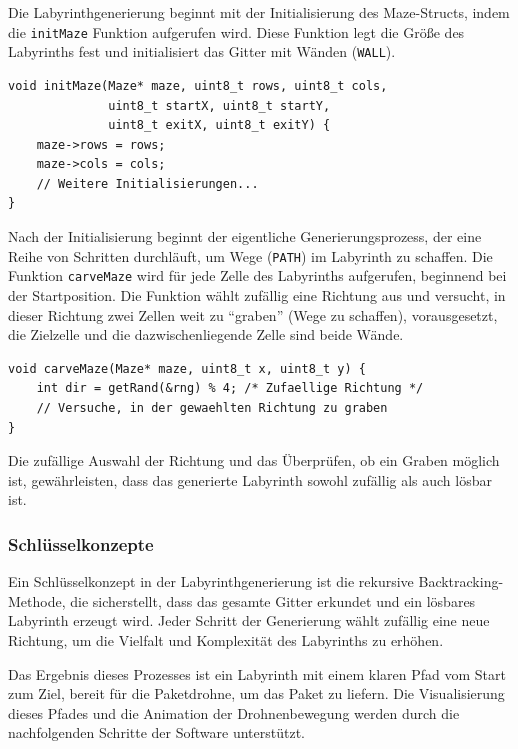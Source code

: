 Die Labyrinthgenerierung beginnt mit der Initialisierung des Maze-Structs, indem die \texttt{initMaze} Funktion aufgerufen wird. Diese Funktion legt die Größe des Labyrinths fest und initialisiert das Gitter mit Wänden (\texttt{WALL}).

\begin{lstlisting}[style=CStyle]
void initMaze(Maze* maze, uint8_t rows, uint8_t cols, 
              uint8_t startX, uint8_t startY, 
              uint8_t exitX, uint8_t exitY) {
    maze->rows = rows;
    maze->cols = cols;
    // Weitere Initialisierungen...
}
\end{lstlisting}

Nach der Initialisierung beginnt der eigentliche Generierungsprozess, der eine Reihe von Schritten durchläuft, um Wege (\texttt{PATH}) im Labyrinth zu schaffen. Die Funktion \texttt{carveMaze} wird für jede Zelle des Labyrinths aufgerufen, beginnend bei der Startposition. Die Funktion wählt zufällig eine Richtung aus und versucht, in dieser Richtung zwei Zellen weit zu “graben” (Wege zu schaffen), vorausgesetzt, die Zielzelle und die dazwischenliegende Zelle sind beide Wände.

\begin{lstlisting}[style=CStyle]
void carveMaze(Maze* maze, uint8_t x, uint8_t y) {
    int dir = getRand(&rng) % 4; /* Zufaellige Richtung */
    // Versuche, in der gewaehlten Richtung zu graben
}
\end{lstlisting}

Die zufällige Auswahl der Richtung und das Überprüfen, ob ein Graben möglich ist, gewährleisten, dass das generierte Labyrinth sowohl zufällig als auch lösbar ist.

\subsubsection{Schlüsselkonzepte}

Ein Schlüsselkonzept in der Labyrinthgenerierung ist die rekursive Backtracking-Methode, die sicherstellt, dass das gesamte Gitter erkundet und ein lösbares Labyrinth erzeugt wird. Jeder Schritt der Generierung wählt zufällig eine neue Richtung, um die Vielfalt und Komplexität des Labyrinths zu erhöhen.

Das Ergebnis dieses Prozesses ist ein Labyrinth mit einem klaren Pfad vom Start zum Ziel, bereit für die Paketdrohne, um das Paket zu liefern. Die Visualisierung dieses Pfades und die Animation der Drohnenbewegung werden durch die nachfolgenden Schritte der Software unterstützt.

